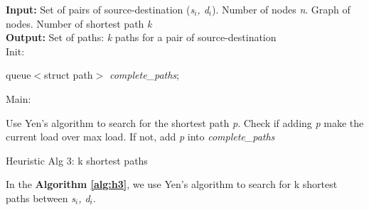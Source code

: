 \begin{algorithm}[!htp]
\textbf{Input:} Set of pairs of source-destination (\textit{s$_i$, d$_i$}). Number of nodes \textit{n}. Graph of nodes. Number of shortest path \textit{k}\\
\textbf{Output:} Set of paths: \textit{k} paths for a pair of source-destination\\
Init:
    \begin{algorithmic}
        \State queue$<$struct path$>$ \textit{complete\_paths};
    \end{algorithmic}
Main:
\begin{algorithmic}
		\State Use Yen's algorithm to search for the shortest path \textit{p}.
		\State Check if adding \textit{p} make the current load over max load.
		\State If not, add \textit{p} into \textit{complete\_paths}
	    \EndWhile
	\EndFor
    \EndFunction
\end{algorithmic}

\caption{Heuristic Alg 3: k shortest paths}
\label{alg:h3}

\end{algorithm}

In the \textbf{Algorithm \ref{alg:h3}}, we use Yen's algorithm to search for k shortest paths between \textit{s$_i$, d$_i$}.

